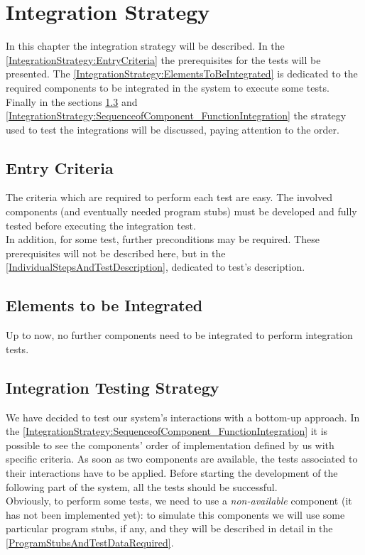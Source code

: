 \documentclass[\mainpath/main]{subfiles}
\begin{document}
\chapter{Integration Strategy} %
\label{IntegrationStrategy}

\setmyfancystyle

In this chapter the integration strategy will be described. In the \autoref{IntegrationStrategy:EntryCriteria} the prerequisites for the tests will be presented. The \autoref{IntegrationStrategy:ElementsToBeIntegrated} is dedicated to the required components to be integrated in the system to execute some tests.\\
Finally in the sections \ref{IntegrationStrategy:IntegrationTestingStrategy} and \ref{IntegrationStrategy:SequenceofComponent_FunctionIntegration} the strategy used to test the integrations will be discussed, paying attention to the order.

\section{Entry Criteria}
\label{IntegrationStrategy:EntryCriteria}
The criteria which are required to perform each test are easy. The involved components (and eventually needed program stubs) must be developed and fully tested before executing the integration test.\\
In addition, for some test, further preconditions may be required. These prerequisites will not be described here, but in the \autoref{IndividualStepsAndTestDescription}, dedicated to test's description.

\section{Elements to be Integrated}
\label{IntegrationStrategy:ElementsToBeIntegrated}
Up to now, no further components need to be integrated to perform integration tests.

\section{Integration Testing Strategy}
\label{IntegrationStrategy:IntegrationTestingStrategy}
We have decided to test our system's interactions with a bottom-up approach. In the \autoref{IntegrationStrategy:SequenceofComponent_FunctionIntegration} it is possible to see the components' order of implementation defined by us with specific criteria. As soon as two components are available, the tests associated to their interactions have to be applied. Before starting the development of the following part of the system, all the tests should be successful.\\ Obviously, to perform some tests, we need to use a \textit{non-available} component (it has not been implemented yet): to simulate this components we will use some particular program stubs, if any, and they will be described in detail in the \autoref{ProgramStubsAndTestDataRequired}.
\end{document}
